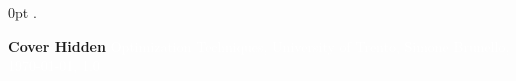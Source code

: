 \documentclass[11pt,fleqn,oneside]{book} %
\newcommand{\AUTHOR}{Simone Brunello}
\newcommand{\DATE}{\today}
\newcommand{\VERSION}{1.0}
\newcommand{\TITLE}{Optimization Techniques}
\newcommand{\SUBTITLE}{University of Trento}
\renewcommand{\coverpage}[5]{{\Huge\textbf{Cover Hidden}}
    \textcolor{white}{#1, #2, #3, #4, #5}}
\begin{document}
    {\topsep}%
    {\topsep}%
    {}%
    {0pt}%
    {\bfseries}%
    {. }%
    { }%
    {\textnormal{}}

    \theoremstyle{theoremdd}


    \newtheorem{definition}{Definition}
    \newtheorem{theorem}{Theorem}

    

    \coverpage{\TITLE}{\SUBTITLE}{\AUTHOR}{\DATE}{\VERSION}

    \newpage

    \pagestyle{fancy}

    
    
    
\end{document}
